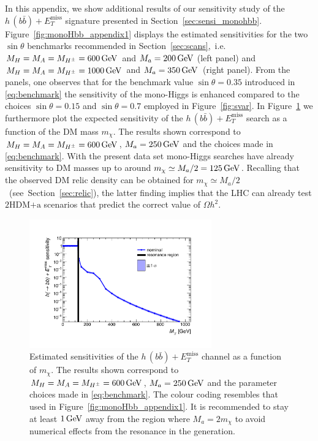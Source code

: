 \documentclass[a4paper, 11pt,notoc]{article}
\newcommand{\MET}{\ensuremath{E_T^\mathrm{miss}}\xspace}
\newcommand{\mA}{\ensuremath{M_{A}}\xspace}
\newcommand{\ma}{\ensuremath{M_{a}}\xspace}
\newcommand{\mH}{\ensuremath{M_{H}}\xspace}
\newcommand{\mHc}{\ensuremath{M_{H^{\pm}}}\xspace}
\newcommand{\hdma}{\ensuremath{\textrm{2HDM+a}}\xspace}
\begin{document}
In this appendix, we  show additional results  of our sensitivity study of the $h \, (b \bar b)+\MET$ signature presented in Section~\ref{sec:sensi_monohbb}. Figure~\ref{fig:monoHbb_appendix1} displays the estimated sensitivities for the two $\sin \theta$ benchmarks recommended in Section~\ref{sec:scans},~i.e.~$\mH = \mA = \mHc = 600 \, {\rm GeV}$ and $\ma = 200 \, {\rm GeV}$ (left panel) and $\mH = \mA = \mHc = 1000 \, {\rm GeV}$ and $\ma = 350 \, {\rm GeV}$~(right panel). From the panels, one observes that for the benchmark value $\sin \theta = 0.35$ introduced in \eqref{eq:benchmark} the sensitivity of the mono-Higgs is enhanced compared to the choices  $\sin \theta = 0.15$ and  $\sin \theta = 0.7$ employed in Figure~\ref{fig:svar}. In Figure~\ref{fig:monoHbb_appendix2} we furthermore  plot the expected sensitivity of the $h \, (b \bar b)+\MET$ search as a function of the DM mass $m_\chi$. The  results shown correspond to $\mH = \mA = \mHc = 600 \, {\rm GeV}$, $\ma = 250 \, {\rm GeV}$ and the choices made in \eqref{eq:benchmark}. With the present data set mono-Higgs searches have already sensitivity to DM masses up to around $m_\chi \simeq \ma/2 = 125 \, {\rm GeV}$. Recalling that the  observed DM relic density can be obtained for $m_\chi \simeq \ma/2$ ~(see~Section~\ref{sec:relic}), the latter finding implies that the LHC can already test  \hdma scenarios that predict the correct value of $\Omega h^2$. 

\begin{figure}[t!]
\centering
\includegraphics[width=0.7\textwidth]{monoHbb_sensi_mDM_scan_red.pdf}
\vspace{-2mm}
\caption{Estimated sensitivities of  the $h \, (b \bar b)+\MET$ channel as a function of $m_\chi$. The  results shown correspond to $\mH = \mA = \mHc = 600 \, {\rm GeV}$, $\ma = 250 \, {\rm GeV}$ and the parameter choices made in \eqref{eq:benchmark}. The colour coding resembles that used in Figure~\ref{fig:monoHbb_appendix1}. It is recommended to stay at least $1 \, {\rm GeV}$ away from the region where $\ma = 2 m_\chi$ to avoid numerical effects from the resonance in the generation. }
\label{fig:monoHbb_appendix2}
\end{figure}



\end{document}
